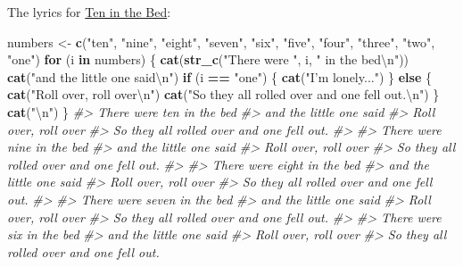 \documentclass[]{book}
\newenvironment{Shaded}{\begin{snugshade}}{\end{snugshade}}
\newcommand{\CharTok}[1]{\textcolor[rgb]{0.31,0.60,0.02}{#1}}
\newcommand{\CommentTok}[1]{\textcolor[rgb]{0.56,0.35,0.01}{\textit{#1}}}
\newcommand{\ControlFlowTok}[1]{\textcolor[rgb]{0.13,0.29,0.53}{\textbf{#1}}}
\newcommand{\KeywordTok}[1]{\textcolor[rgb]{0.13,0.29,0.53}{\textbf{#1}}}
\newcommand{\NormalTok}[1]{#1}
\newcommand{\OperatorTok}[1]{\textcolor[rgb]{0.81,0.36,0.00}{\textbf{#1}}}
\newcommand{\StringTok}[1]{\textcolor[rgb]{0.31,0.60,0.02}{#1}}
\theoremstyle{definition}
\theoremstyle{definition}
\theoremstyle{definition}
\theoremstyle{remark}
\begin{document}
The lyrics for
\href{http://supersimplelearning.com/songs/original-series/one/ten-in-the-bed/}{Ten
in the Bed}:

\begin{Shaded}
\begin{Highlighting}[]
\NormalTok{numbers <-}\StringTok{ }\KeywordTok{c}\NormalTok{(}\StringTok{"ten"}\NormalTok{, }\StringTok{"nine"}\NormalTok{, }\StringTok{"eight"}\NormalTok{, }\StringTok{"seven"}\NormalTok{, }\StringTok{"six"}\NormalTok{, }\StringTok{"five"}\NormalTok{,}
             \StringTok{"four"}\NormalTok{, }\StringTok{"three"}\NormalTok{, }\StringTok{"two"}\NormalTok{, }\StringTok{"one"}\NormalTok{)}
\ControlFlowTok{for}\NormalTok{ (i }\ControlFlowTok{in}\NormalTok{ numbers) \{}
  \KeywordTok{cat}\NormalTok{(}\KeywordTok{str_c}\NormalTok{(}\StringTok{"There were "}\NormalTok{, i, }\StringTok{" in the bed}\CharTok{\textbackslash{}n}\StringTok{"}\NormalTok{))}
  \KeywordTok{cat}\NormalTok{(}\StringTok{"and the little one said}\CharTok{\textbackslash{}n}\StringTok{"}\NormalTok{)}
  \ControlFlowTok{if}\NormalTok{ (i }\OperatorTok{==}\StringTok{ "one"}\NormalTok{) \{}
    \KeywordTok{cat}\NormalTok{(}\StringTok{"I'm lonely..."}\NormalTok{)}
\NormalTok{  \} }\ControlFlowTok{else}\NormalTok{ \{}
    \KeywordTok{cat}\NormalTok{(}\StringTok{"Roll over, roll over}\CharTok{\textbackslash{}n}\StringTok{"}\NormalTok{)}
    \KeywordTok{cat}\NormalTok{(}\StringTok{"So they all rolled over and one fell out.}\CharTok{\textbackslash{}n}\StringTok{"}\NormalTok{)}
\NormalTok{  \}}
  \KeywordTok{cat}\NormalTok{(}\StringTok{"}\CharTok{\textbackslash{}n}\StringTok{"}\NormalTok{)}
\NormalTok{\}}
\CommentTok{#> There were ten in the bed}
\CommentTok{#> and the little one said}
\CommentTok{#> Roll over, roll over}
\CommentTok{#> So they all rolled over and one fell out.}
\CommentTok{#> }
\CommentTok{#> There were nine in the bed}
\CommentTok{#> and the little one said}
\CommentTok{#> Roll over, roll over}
\CommentTok{#> So they all rolled over and one fell out.}
\CommentTok{#> }
\CommentTok{#> There were eight in the bed}
\CommentTok{#> and the little one said}
\CommentTok{#> Roll over, roll over}
\CommentTok{#> So they all rolled over and one fell out.}
\CommentTok{#> }
\CommentTok{#> There were seven in the bed}
\CommentTok{#> and the little one said}
\CommentTok{#> Roll over, roll over}
\CommentTok{#> So they all rolled over and one fell out.}
\CommentTok{#> }
\CommentTok{#> There were six in the bed}
\CommentTok{#> and the little one said}
\CommentTok{#> Roll over, roll over}
\CommentTok{#> So they all rolled over and one fell out.}

\end{Highlighting}
\end{Shaded}
\end{document}
